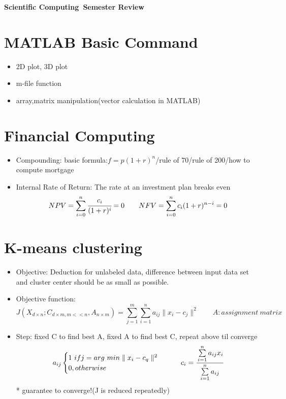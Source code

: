 \documentclass[12pt,a4paper,draft]{article}
\newcommand{\classname}{Scientific Computing}
\begin{document}
\begin{center}
\LARGE\textbf{\classname \ Semester Review}
\end{center}
\section{MATLAB Basic Command}%
\begin{itemize}
\item 2D plot, 3D plot
\item m-file function
\item array,matrix manipulation(vector calculation in MATLAB)
\end{itemize}
\section{Financial Computing}%
\begin{itemize}
\item Compounding: basic formula:$f=p(1+r)^n$/rule of 70/rule of 200/how to compute mortgage 
\item Internal Rate of Return: The rate at an  investment plan breaks even$$NPV = \sum_{i=0}^n \cfrac{c_i}{(1+r)^i} = 0\qquad NFV = \sum_{i=0}^n c_i(1+r)^{n-i} = 0$$
\end{itemize}
\section{K-means clustering}%
\begin{itemize}
\item Objective: Deduction for unlabeled data, difference between input data set and cluster center should be as small as possible.
\item Objective function:$$J(X_{d\times n};C_{d\times m,m<<n},A_{n\times m}) = \sum_{j=1}^m \sum_{i=1}^n a_{ij}\parallel x_i -c_j \parallel^2 \qquad A:assignment\  matrix$$
\item Step: fixed C to find best A, fixed A to find best C, repeat above til converge
$$a_{ij}\begin{cases} 1\ if j=arg \ min \parallel x_i -c_q \parallel^2\\ 0,otherwise\end{cases} \qquad c_i = \cfrac{\sum\limits_{i=1}^n a_{ij}x_i}{\sum\limits_{i=1}^na_{ij}}$$
* guarantee to converge!(J is reduced repeatedly)
\end{itemize}
\end{document}
